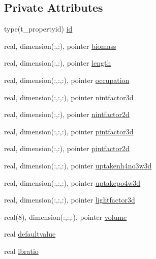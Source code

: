 \subsection*{Private Attributes}
\begin{DoxyCompactItemize}
\item 
type(t\+\_\+propertyid) \mbox{\hyperlink{structmodulewaterproperties_1_1t__seagrassesleaves_ab9fb3c1ed91c99bf16a26faf2be15b24}{id}}
\item 
real, dimension(\+:,\+:), pointer \mbox{\hyperlink{structmodulewaterproperties_1_1t__seagrassesleaves_a1de6e4aaf597520a1c34435cf30910ef}{biomass}}
\item 
real, dimension(\+:,\+:), pointer \mbox{\hyperlink{structmodulewaterproperties_1_1t__seagrassesleaves_a5f9ec41396f7df09db8624fcda22e6b3}{length}}
\item 
real, dimension(\+:,\+:,\+:), pointer \mbox{\hyperlink{structmodulewaterproperties_1_1t__seagrassesleaves_ad7239efed6e125330ac18bf6caeb370d}{occupation}}
\item 
real, dimension(\+:,\+:,\+:), pointer \mbox{\hyperlink{structmodulewaterproperties_1_1t__seagrassesleaves_a31bcfea22b4cf969edf65c37e931e94f}{nintfactor3d}}
\item 
real, dimension(\+:,\+:), pointer \mbox{\hyperlink{structmodulewaterproperties_1_1t__seagrassesleaves_ae78144d034fdc3485058ab41765fed81}{nintfactor2d}}
\item 
real, dimension(\+:,\+:,\+:), pointer \mbox{\hyperlink{structmodulewaterproperties_1_1t__seagrassesleaves_a9a770f1c30e345d0071598ed22d611c8}{pintfactor3d}}
\item 
real, dimension(\+:,\+:), pointer \mbox{\hyperlink{structmodulewaterproperties_1_1t__seagrassesleaves_a47d4f865f9fe4b242c4a2d6a74a251ae}{pintfactor2d}}
\item 
real, dimension(\+:,\+:,\+:), pointer \mbox{\hyperlink{structmodulewaterproperties_1_1t__seagrassesleaves_a505a96977276d64a989ef71ed002a9a9}{uptakenh4no3w3d}}
\item 
real, dimension(\+:,\+:,\+:), pointer \mbox{\hyperlink{structmodulewaterproperties_1_1t__seagrassesleaves_a7849f363f9072bc9c84d0e586ae68834}{uptakepo4w3d}}
\item 
real, dimension(\+:,\+:,\+:), pointer \mbox{\hyperlink{structmodulewaterproperties_1_1t__seagrassesleaves_aa46596f9374b990d7d6399bd62108ecd}{lightfactor3d}}
\item 
real(8), dimension(\+:,\+:,\+:), pointer \mbox{\hyperlink{structmodulewaterproperties_1_1t__seagrassesleaves_a708682e5389bddc9613fa1e4789d5a35}{volume}}
\item 
real \mbox{\hyperlink{structmodulewaterproperties_1_1t__seagrassesleaves_a3f455c759398905185846f31b3a5bfa6}{defaultvalue}}
\item 
real \mbox{\hyperlink{structmodulewaterproperties_1_1t__seagrassesleaves_a7d06b48f5d35a7323ebb217ebc31e545}{lbratio}}
\end{DoxyCompactItemize}


